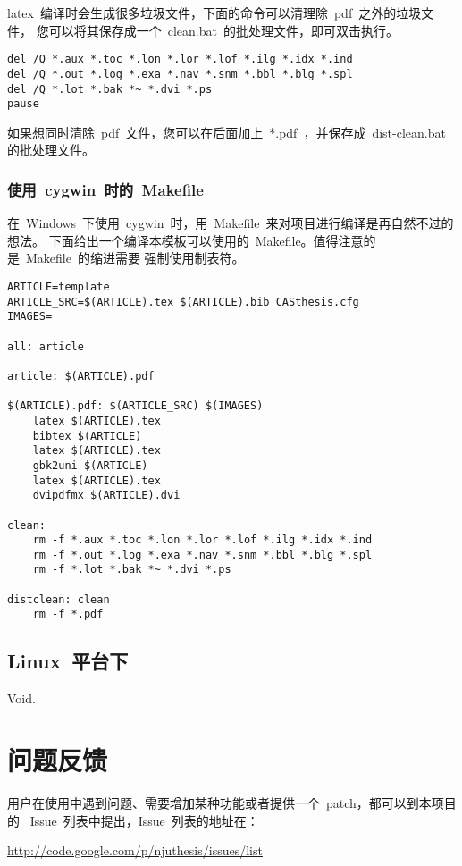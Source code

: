 \documentclass[oneside, phd]{njuthesis}
\begin{document}
latex~编译时会生成很多垃圾文件，下面的命令可以清理除~pdf~之外的垃圾文件，
您可以将其保存成一个~clean.bat~的批处理文件，即可双击执行。

\begin{Verbatim}[frame=lines]
del /Q *.aux *.toc *.lon *.lor *.lof *.ilg *.idx *.ind
del /Q *.out *.log *.exa *.nav *.snm *.bbl *.blg *.spl
del /Q *.lot *.bak *~ *.dvi *.ps
pause
\end{Verbatim}

如果想同时清除~pdf~文件，您可以在后面加上~*.pdf~，并保存成~dist-clean.bat~
的批处理文件。

\subsubsection{使用~cygwin~时的~Makefile}

在~Windows~下使用~cygwin~时，用~Makefile~来对项目进行编译是再自然不过的想法。
下面给出一个编译本模板可以使用的~Makefile。值得注意的是~Makefile~的缩进需要
强制使用制表符。

\begin{Verbatim}[frame=lines]
ARTICLE=template
ARTICLE_SRC=$(ARTICLE).tex $(ARTICLE).bib CASthesis.cfg
IMAGES=

all: article

article: $(ARTICLE).pdf

$(ARTICLE).pdf: $(ARTICLE_SRC) $(IMAGES)
	latex $(ARTICLE).tex
	bibtex $(ARTICLE)
	latex $(ARTICLE).tex
	gbk2uni $(ARTICLE)
	latex $(ARTICLE).tex
	dvipdfmx $(ARTICLE).dvi

clean:
	rm -f *.aux *.toc *.lon *.lor *.lof *.ilg *.idx *.ind
	rm -f *.out *.log *.exa *.nav *.snm *.bbl *.blg *.spl
	rm -f *.lot *.bak *~ *.dvi *.ps

distclean: clean
	rm -f *.pdf
\end{Verbatim}

\subsection{Linux~平台下}

Void.

\section{问题反馈}

用户在使用中遇到问题、需要增加某种功能或者提供一个~patch，都可以到本项目的
~Issue~列表中提出，Issue~列表的地址在：

\begin{center}
\url{http://code.google.com/p/njuthesis/issues/list}
\end{center}
\end{document}
